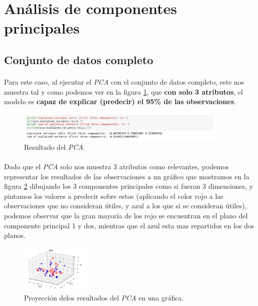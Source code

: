 \section{Análisis de componentes principales}
\label{resultados:pca}

\subsection{Conjunto de datos completo}

\paragraph{}
Para este caso, al ejecutar el \textit{PCA} con el conjunto de datos completo, este nos muestra tal y como podemos ver en la figura \ref{pcaOneResult}, que \textbf{con solo 3 atributos}, el modelo es \textbf{capaz de explicar (predecir) el 95\% de las observaciones}.

\begin{figure}[!htb]
  \centering
    \includegraphics[width=0.9\textwidth]{images/resultados_procesado_de_datos_pca1_result.png}
    \caption{Resultado del \textit{PCA}.}
  \label{pcaOneResult}
\end{figure}

\paragraph{}
Dado que el \textit{PCA} solo nos muestra 3 atributos como relevantes, podemos representar los resultados de las observaciones a un gráfico que mostramos en la figura \ref{pcaOneGraphic} dibujando los 3 componentes principales como si fueran 3 dimensiones, y pintamos los valores a predecir sobre estos (aplicando el color rojo a las observaciones que no consideran útiles, y azul a los que si se consideran útiles), podemos observar que la gran mayoría de los rojo se encuentran en el plano del componente principal 1 y dos, mientras que el azul esta mas repartidos en los dos planos.

\begin{figure}[!htb]
  \centering
    \includegraphics[width=0.3\textwidth]{images/resultados_procesado_de_datos_pca1_graphic.png}
    \caption{Proyección delos resultados del \textit{PCA} en una gráfica.}
  \label{pcaOneGraphic}
\end{figure}

